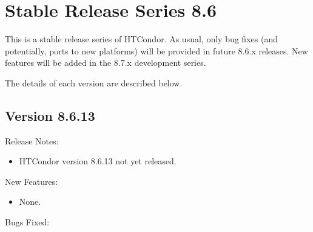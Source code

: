 
\section{\label{sec:History-8-6}Stable Release Series 8.6}

This is a stable release series of HTCondor.
As usual, only bug fixes (and potentially, ports to new platforms)
will be provided in future 8.6.x releases.
New features will be added in the 8.7.x development series.

The details of each version are described below.

\subsection*{\label{sec:New-8-6-13}Version 8.6.13}

\noindent Release Notes:

\begin{itemize}

\item HTCondor version 8.6.13 not yet released.

\end{itemize}


\noindent New Features:

\begin{itemize}

\item None.

\end{itemize}

\noindent Bugs Fixed:

